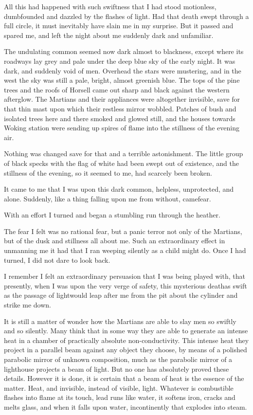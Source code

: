 All this had happened with such swiftness that I had stood
motionless, dumbfounded and dazzled by the flashes of light. Had
that death swept through a full circle, it must inevitably have
slain me in my surprise. But it passed and spared me, and left the
night about me suddenly dark and unfamiliar.

The undulating common seemed now dark almost to blackness, except
where its roadways lay grey and pale under the deep blue sky of the
early night. It was dark, and suddenly void of men. Overhead the
stars were mustering, and in the west the sky was still a pale,
bright, almost greenish blue. The tops of the pine trees and the
roofs of Horsell came out sharp and black against the western
afterglow. The Martians and their appliances were altogether
invisible, save for that thin mast upon which their restless mirror
wobbled. Patches of bush and isolated trees here and there smoked
and glowed still, and the houses towards Woking station were
sending up spires of flame into the stillness of the evening air.

Nothing was changed save for that and a terrible astonishment. The
little group of black specks with the flag of white had been swept
out of existence, and the stillness of the evening, so it seemed to
me, had scarcely been broken.

It came to me that I was upon this dark common, helpless,
unprotected, and alone. Suddenly, like a thing falling upon me from
without, came\dash{}fear.

With an effort I turned and began a stumbling run through the
heather.

The fear I felt was no rational fear, but a panic terror not only
of the Martians, but of the dusk and stillness all about me. Such
an extraordinary effect in unmanning me it had that I ran weeping
silently as a child might do. Once I had turned, I did not dare to
look back.

I remember I felt an extraordinary persuasion that I was being
played with, that presently, when I was upon the very verge of
safety, this mysterious death\dash{}as swift as the passage of
light\dash{}would leap after me from the pit about the cylinder and
strike me down.

It is still a matter of wonder how the Martians are able to slay
men so swiftly and so silently. Many think that in some way they
are able to generate an intense heat in a chamber of practically
absolute non-conductivity. This intense heat they project in a
parallel beam against any object they choose, by means of a
polished parabolic mirror of unknown composition, much as the
parabolic mirror of a lighthouse projects a beam of light. But no
one has absolutely proved these details. However it is done, it is
certain that a beam of heat is the essence of the matter. Heat, and
invisible, instead of visible, light. Whatever is combustible
flashes into flame at its touch, lead runs like water, it softens
iron, cracks and melts glass, and when it falls upon water,
incontinently that explodes into steam.

